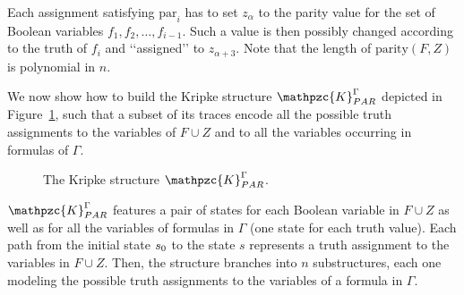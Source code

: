 Each assignment satisfying $\text{par}_i$ has to set $z_{\alpha}$ to the parity value for the set of Boolean variables $f_1,f_2, \ldots, f_{i-1}$. Such a value is then possibly changed according to the truth of $f_i$ and \lq\lq assigned\rq\rq{} to $z_{\alpha + 3}$. Note that the length of $\text{parity}(F,Z)$ is polynomial in $n$.

We now show how to build the Kripke structure $\mathpzc{K}_{PAR}^{\Gamma}$ depicted in Figure~\ref{Kpar}, such that a subset of its traces encode all the possible truth assignments to the variables of $F\cup Z$ and to all the variables occurring in formulas of $\Gamma$.
%
%
\begin{figure}[tb]
\centering
\resizebox{\linewidth}{!}{}
\caption{The Kripke structure $\mathpzc{K}_{PAR}^{\Gamma}$.}\label{Kpar}
\end{figure}
%
$\mathpzc{K}_{PAR}^{\Gamma}$ features a pair of states for each Boolean variable in $F\cup Z$ as well as for all the variables of formulas in $\Gamma$ (one state for each truth value). Each path from the initial state $s_0$ to the state $s$ represents a truth assignment to the variables in $F \cup Z$. Then, the structure branches into $n$ substructures, each one modeling 
the possible truth assignments to the variables of a formula in $\Gamma$. 

